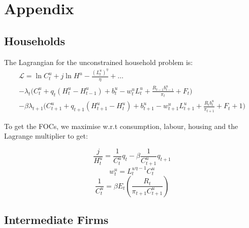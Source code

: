 \documentclass[11pt, a4paper]{article}
\begin{document}





\section*{Appendix}
\subsection*{Households}

The Lagrangian for the unconstrained household problem is:
\begin{equation}
\begin{aligned}
  \mathcal{L} = \ln C^u_t + j  \ln H^u - \frac{\left(L_{t}^{u}\right)^{\eta}}{\eta} + \dots \\
  - \lambda_t \bigg(C_{t}^{u}+q_{t}\left(H_{t}^{u}-H_{t-1}^{u}\right)+b_{t}^{u} - w_{t}^{u} L_{t}^{u}+\frac{R_{t-1} b_{t-1}^{u}}{\pi_{t}}+F_{t}\bigg)  \\- \beta \lambda_{t+1} \bigg(C_{t+1}^{u}+q_{t+1}\left(H_{t+1}^{u}-H_{t}^{u}\right)+b_{t+1}^{u} - w_{t+1}^{u} L_{t+1}^{u}+\frac{R_{t} b_{t}^{u}}{\pi_{t+1}}+F_{t}+1\bigg)
  \end{aligned}
\end{equation}

To get the FOCs, we maximise w.r.t consumption, labour, housing and the Lagrange multiplier to get: 

\begin{equation}
  \frac{j}{H^{u}_t} = \frac{1}{C^{u}_{t}} q_t - \beta \frac{1}{C^{u}_{t+1}} q_{t+1}
\end{equation}
\begin{equation}
  w_t^u = {L_t^{u}}^{\eta -1} C^u_t
\end{equation}
\begin{equation}
\frac{1}{C_{t}^{u}}=\beta E_{t}\left(\frac{R_{t}}{\pi_{t+1} C_{t+1}^{u}}\right)
\end{equation}

\subsection*{Intermediate Firms}
\end{document}

